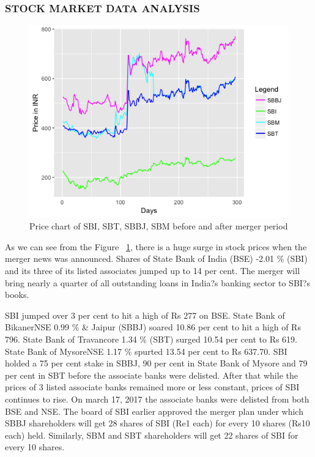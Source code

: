 \documentclass[a4paper, 12pt]{extarticle}
\begin{document}
{\subsubsection{STOCK MARKET DATA ANALYSIS}
\begin{figure}[H]
\centering
\includegraphics[scale=0.8]{price_action.png}
\caption{Price chart of SBI, SBT, SBBJ, SBM before and after merger period}
\label{fig:price_action}
\end{figure}

\par As we can see from the Figure ~\ref{fig:price_action}, there is a huge surge in stock prices when the merger news was announced. Shares of State Bank of India (BSE) -2.01 \% (SBI) and its three of its listed associates jumped up to 14 per cent. The merger will bring nearly a quarter of all outstanding loans in India?s banking sector to SBI?s books.

SBI jumped over 3 per cent to hit a high of Rs 277 on BSE. State Bank of BikanerNSE 0.99 \% \& Jaipur (SBBJ) soared 10.86 per cent to hit a high of Rs 796. State Bank of Travancore 1.34 \% (SBT) surged 10.54 per cent to Rs 619. State Bank of MysoreNSE 1.17 \% spurted 13.54 per cent to Rs 637.70. SBI holded a 75 per cent stake in SBBJ, 90 per cent in State Bank of Mysore and 79 per cent in SBT before the associate banks were delisted. After that while the prices of 3 listed associate banks remained more or less constant, prices of SBI continues to rise. On march 17, 2017 the associate banks were delisted from both BSE and NSE. The board of SBI earlier approved the merger plan under which SBBJ shareholders will get 28 shares of SBI (Re1 each) for every 10 shares (Rs10 each) held. Similarly, SBM and SBT shareholders will get 22 shares of SBI for every 10 shares.

}
\end{document}
